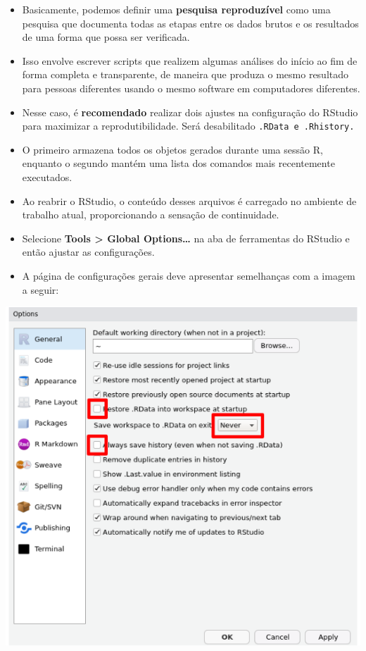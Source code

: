 \documentclass[
  letterpaper,
  DIV=11,
  numbers=noendperiod]{scrartcl}
\begin{document}
\begin{itemize}
\item
  Basicamente, podemos definir uma \textbf{pesquisa reproduzível} como
  uma pesquisa que documenta todas as etapas entre os dados brutos e os
  resultados de uma forma que possa ser verificada.
\item
  Isso envolve escrever scripts que realizem algumas análises do início
  ao fim de forma completa e transparente, de maneira que produza o
  mesmo resultado para pessoas diferentes usando o mesmo software em
  computadores diferentes.
\item
  Nesse caso, é \textbf{recomendado} realizar dois ajustes na
  configuração do RStudio para maximizar a reprodutibilidade. Será
  desabilitado \texttt{.RData\ e\ .Rhistory.}
\item
  O primeiro armazena todos os objetos gerados durante uma sessão R,
  enquanto o segundo mantém uma lista dos comandos mais recentemente
  executados.
\item
  Ao reabrir o RStudio, o conteúdo desses arquivos é carregado no
  ambiente de trabalho atual, proporcionando a sensação de continuidade.
\item
  Selecione \textbf{Tools \textgreater{} Global Options\ldots{}} na aba
  de ferramentas do RStudio e então ajustar as configurações.
\item
  A página de configurações gerais deve apresentar semelhanças com a
  imagem a seguir:
\end{itemize}

\includegraphics{Figuras/options.png}
\end{document}
